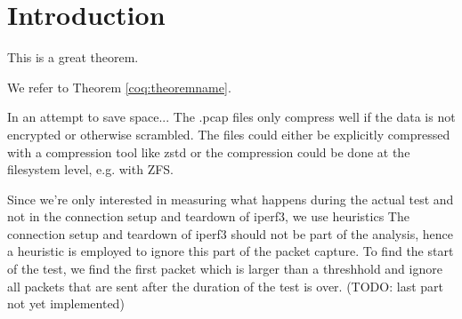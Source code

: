 
\chapter{Introduction}


\begin{theorem}[Test][theoremname]
  This is a great theorem.
\end{theorem}

We refer to Theorem \ref{coq:theoremname}.

In an attempt to save space...
The .pcap files only compress well if the data is not encrypted or otherwise scrambled.
The files could either be explicitly compressed with a compression tool like zstd or the compression could be done at the filesystem level, e.g. with ZFS.


Since we're only interested in measuring what happens during the actual test and not in the connection setup and teardown of iperf3, we use heuristics
The connection setup and teardown of iperf3 should not be part of the analysis, hence a heuristic is employed to ignore this part of the packet capture. To find the start of the test, we find the first packet which is larger than a threshhold and ignore all packets that are sent after the duration of the test is over. (TODO: last part not yet implemented)

